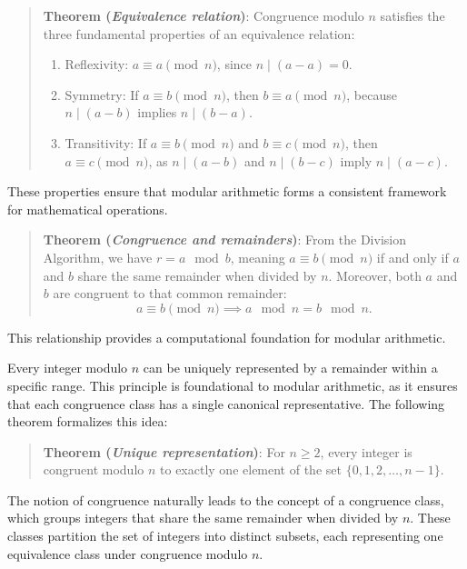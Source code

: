 \documentclass[
  letterpaper,
  DIV=11,
  numbers=noendperiod,
  oneside]{scrartcl}
\begin{document}
\begin{quote}
\textbf{Theorem (\emph{Equivalence relation})}: Congruence modulo \(n\)
satisfies the three fundamental properties of an equivalence relation:

\begin{enumerate}
\def\labelenumi{\arabic{enumi}.}
\item
  Reflexivity: \(a \equiv a \pmod{n}\), since \(n \mid (a - a) = 0\).
\item
  Symmetry: If \(a \equiv b \pmod{n}\), then \(b \equiv a \pmod{n}\),
  because \(n \mid (a - b)\) implies \(n \mid (b - a)\).
\item
  Transitivity: If \(a \equiv b \pmod{n}\) and \(b \equiv c \pmod{n}\),
  then \(a \equiv c \pmod{n}\), as \(n \mid (a - b)\) and
  \(n \mid (b - c)\) imply \(n \mid (a - c)\).
\end{enumerate}
\end{quote}

These properties ensure that modular arithmetic forms a consistent
framework for mathematical operations.

\begin{quote}
\textbf{Theorem (\emph{Congruence and remainders})}: From the Division
Algorithm, we have \(r = a \mod b\), meaning \(a \equiv b \pmod{n}\) if
and only if \(a\) and \(b\) share the same remainder when divided by
\(n\). Moreover, both \(a\) and \(b\) are congruent to that common
remainder: \[
a \equiv b \pmod{n} \implies a \mod n = b \mod n.
\]
\end{quote}

This relationship provides a computational foundation for modular
arithmetic.

Every integer modulo \(n\) can be uniquely represented by a remainder
within a specific range. This principle is foundational to modular
arithmetic, as it ensures that each congruence class has a single
canonical representative. The following theorem formalizes this idea:

\begin{quote}
\textbf{Theorem (\emph{Unique representation})}: For \(n \geq 2\), every
integer is congruent modulo \(n\) to exactly one element of the set
\(\{0, 1, 2, \dots, n-1\}\).
\end{quote}

The notion of congruence naturally leads to the concept of a congruence
class, which groups integers that share the same remainder when divided
by \(n\). These classes partition the set of integers into distinct
subsets, each representing one equivalence class under congruence modulo
\(n\).
\end{document}
